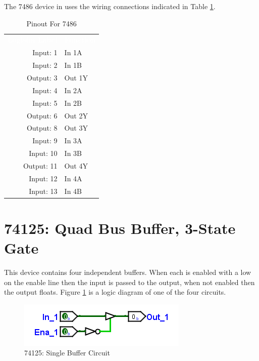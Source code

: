The 7486 device in \LE uses the wiring connections indicated in Table \ref{tab:50-7486}.

\begin{table}[H]
	\sffamily
	\newcommand{\head}[1]{\textcolor{white}{\textbf{#1}}}		
	\begin{center}
		\begin{tabular}{rl} 
			\rowcolor{black!75}
			\head{Logisim Label} & \head{Function} \\
			Input: 1   & In 1A  \\
			Input: 2   & In 1B  \\
			Output: 3  & Out 1Y \\
			Input: 4   & In 2A  \\
			Input: 5   & In 2B  \\
			Output: 6  & Out 2Y \\
			Output: 8  & Out 3Y \\
			Input: 9   & In 3A  \\
			Input: 10  & In 3B  \\
			Output: 11 & Out 4Y \\
			Input: 12  & In 4A  \\
			Input: 13  & In 4B  \\
		\end{tabular}
	\end{center}
	\caption{Pinout For 7486}
	\label{tab:50-7486}
\end{table}

\section{74125: Quad Bus Buffer, 3-State Gate}

This device contains four independent buffers. When each is enabled with a low on the enable line then the input is passed to the output, when not enabled then the output floats. Figure \ref{fig:50-74125} is a logic diagram of one of the four circuits.

\begin{figure}[H]
	\centering
	\includegraphics{gfx/50-74125}
	\caption{74125: Single Buffer Circuit}
	\label{fig:50-74125}
\end{figure}

